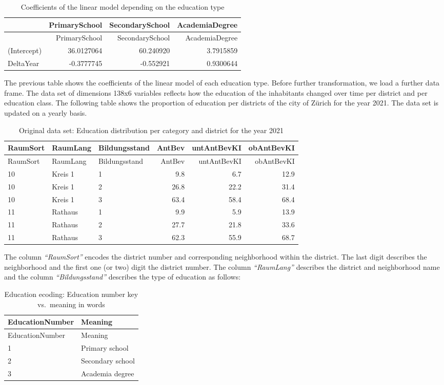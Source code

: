 \documentclass[
]{article}
\begin{document}
\begin{longtable}[]{@{}lrrr@{}}
\caption{Coefficients of the linear model depending on the education
type}\tabularnewline
\toprule
& PrimarySchool & SecondarySchool & AcademiaDegree\tabularnewline
\midrule
\endfirsthead
\toprule
& PrimarySchool & SecondarySchool & AcademiaDegree\tabularnewline
\midrule
\endhead
(Intercept) & 36.0127064 & 60.240920 & 3.7915859\tabularnewline
DeltaYear & -0.3777745 & -0.552921 & 0.9300644\tabularnewline
\bottomrule
\end{longtable}

The previous table shows the coefficients of the linear model of each
education type. Before further transformation, we load a further data
frame. The data set of dimensions 138x6 variables reflects how the
education of the inhabitants changed over time per district and per
education class. The following table shows the proportion of education
per districts of the city of Zürich for the year 2021. The data set is
updated on a yearly basis.

\begin{longtable}[]{@{}lllrrr@{}}
\caption{Original data set: Education distribution per category and
district for the year 2021}\tabularnewline
\toprule
RaumSort & RaumLang & Bildungsstand & AntBev & untAntBevKI &
obAntBevKI\tabularnewline
\midrule
\endfirsthead
\toprule
RaumSort & RaumLang & Bildungsstand & AntBev & untAntBevKI &
obAntBevKI\tabularnewline
\midrule
\endhead
10 & Kreis 1 & 1 & 9.8 & 6.7 & 12.9\tabularnewline
10 & Kreis 1 & 2 & 26.8 & 22.2 & 31.4\tabularnewline
10 & Kreis 1 & 3 & 63.4 & 58.4 & 68.4\tabularnewline
11 & Rathaus & 1 & 9.9 & 5.9 & 13.9\tabularnewline
11 & Rathaus & 2 & 27.7 & 21.8 & 33.6\tabularnewline
11 & Rathaus & 3 & 62.3 & 55.9 & 68.7\tabularnewline
\bottomrule
\end{longtable}

The column \emph{``RaumSort''} encodes the district number and
corresponding neighborhood within the district. The last digit describes
the neighborhood and the first one (or two) digit the district number.
The column \emph{``RaumLang''} describes the district and neighborhood
name and the column \emph{``Bildungsstand''} describes the type of
education as follows:

\begin{longtable}[]{@{}ll@{}}
\caption{Education ecoding: Education number key vs.~meaning in
words}\tabularnewline
\toprule
EducationNumber & Meaning\tabularnewline
\midrule
\endfirsthead
\toprule
EducationNumber & Meaning\tabularnewline
\midrule
\endhead
1 & Primary school\tabularnewline
2 & Secondary school\tabularnewline
3 & Academia degree\tabularnewline
\bottomrule
\end{longtable}
\end{document}
